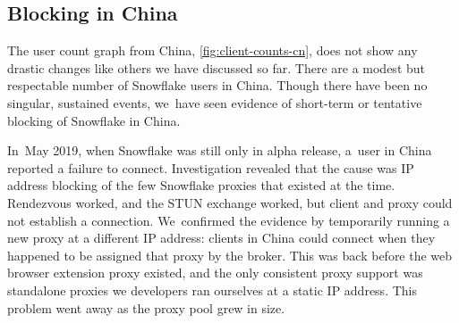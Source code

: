 \documentclass[letterpaper,twocolumn]{article}
\begin{document}
\subsection{Blocking in China}
\label{sec:block-cn}


The user count graph from China,
\autoref{fig:client-counts-cn},
does not show any drastic changes
like others we have discussed so far.
There are a modest but respectable number of Snowflake users in China.
Though there have been no singular, sustained events,
we~have seen evidence of short-term or tentative
blocking of Snowflake in China.

In~May 2019, when Snowflake was still only in alpha release,
a~user in China reported a failure to connect.
Investigation revealed that the cause was IP address blocking of
the few Snowflake proxies that existed at the time.
Rendezvous worked, and the STUN exchange worked,
but client and proxy could not establish a connection.
We~confirmed the evidence by temporarily running a new proxy
at a different IP address:
clients in China could connect when they happened to be assigned
that proxy by the broker.
This was back before the web browser extension proxy existed,
and the only consistent proxy support was standalone proxies
we developers ran ourselves at a static IP address.
This problem went away as the proxy pool grew in size.
\end{document}
